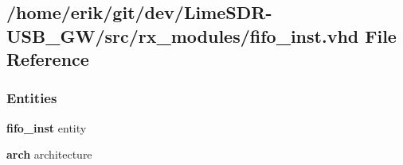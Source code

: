 \subsection{/home/erik/git/dev/\+Lime\+S\+D\+R-\/\+U\+S\+B\+\_\+\+G\+W/src/rx\+\_\+modules/fifo\+\_\+inst.vhd File Reference}
\label{rx__modules_2fifo__inst_8vhd}
\subsubsection*{Entities}
\begin{DoxyCompactItemize}
\item 
{\bf fifo\+\_\+inst} entity
\item 
{\bf arch} architecture
\end{DoxyCompactItemize}
